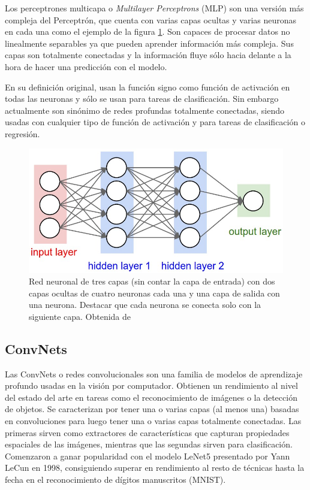 Los perceptrones multicapa o \textit{Multilayer Perceptrons} (MLP) son una versión más compleja del Perceptrón, que cuenta con varias capas ocultas y varias neuronas en cada una como el ejemplo de la figura \ref{fig:NeuralNet}. Son capaces de procesar datos no linealmente separables ya que pueden aprender información más compleja. Sus capas son totalmente conectadas y la información fluye sólo hacia delante a la hora de hacer una predicción con el modelo. 

En su definición original, usan la función signo como función de activación en todas las neuronas y sólo se usan para tareas de clasificación. Sin embargo actualmente son sinónimo de redes profundas totalmente conectadas, siendo usadas con cualquier tipo de función de activación y para tareas de clasificación o regresión.

\begin{figure}
    \centering
    \includegraphics[width=0.75\linewidth]{Plantilla_TFG_latex//imagenes//Inf//2.Fund/neural_net2.jpeg}
    \caption{Red neuronal de tres capas (sin contar la capa de entrada) con dos capas ocultas de cuatro neuronas cada una y una capa de salida con una neurona. Destacar que cada neurona se conecta solo con la siguiente capa. Obtenida de \cite{stanford_231}}
    \label{fig:NeuralNet}
\end{figure}


\subsection{ConvNets}
\label{sec:convnets}

Las ConvNets o redes convolucionales son una familia de modelos de aprendizaje profundo usadas en la visión por computador. Obtienen un rendimiento al nivel del estado del arte en tareas como el reconocimiento de imágenes o la detección de objetos. Se caracterizan por tener una o varias capas (al menos una) basadas en convoluciones para luego tener una o varias capas totalmente conectadas. Las primeras sirven como extractores de características que capturan propiedades espaciales de las imágenes, mientras que las segundas sirven para clasificación. Comenzaron a ganar popularidad con el modelo LeNet5 \cite{lenet5} presentado por Yann LeCun en 1998, consiguiendo superar en rendimiento al resto de técnicas hasta la fecha en el reconocimiento de dígitos manuscritos (MNIST).

